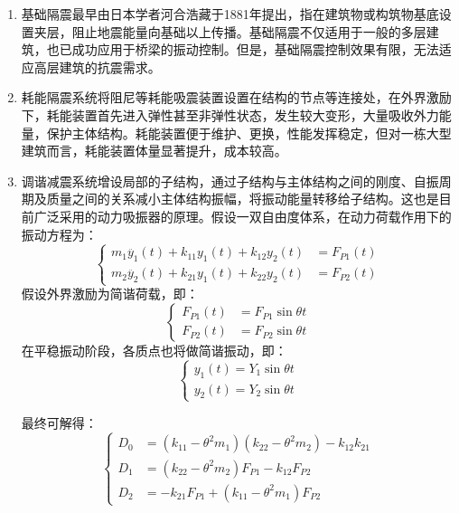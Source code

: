 \begin{enumerate}
	\item 基础隔震最早由日本学者河合浩藏于1881年提出，指在建筑物或构筑物基底设置夹层，阻止地震能量向基础以上传播。基础隔震不仅适用于一般的多层建筑，也已成功应用于桥梁的振动控制。但是，基础隔震控制效果有限，无法适应高层建筑的抗震需求\cite{Sun2012}。
	\item 耗能隔震系统将阻尼等耗能吸震装置设置在结构的节点等连接处，在外界激励下，耗能装置首先进入弹性甚至非弹性状态，发生较大变形，大量吸收外力能量，保护主体结构。耗能装置便于维护、更换，性能发挥稳定，但对一栋大型建筑而言，耗能装置体量显著提升，成本较高。
	\item 调谐减震系统增设局部的子结构，通过子结构与主体结构之间的刚度、自振周期及质量之间的关系减小主体结构振幅，将振动能量转移给子结构。这也是目前广泛采用的动力吸振器的原理。假设一双自由度体系，在动力荷载作用下的振动方程为：
	\begin{equation}
	\label{vibration}
	\left\{
	\begin{array}{rl}
	m_1\ddot{y_1}\left(t\right)+k_{11}y_1\left(t\right)+k_{12}y_2\left(t\right)&=F_{P1}\left(t\right)\\
	m_2\ddot{y_2}\left(t\right)+k_{21}y_1\left(t\right)+k_{22}y_2\left(t\right)&=F_{P2}\left(t\right)
	\end{array}
	\right.
	\end{equation}
	假设外界激励为简谐荷载，即：
	\begin{equation}
	\label{sin}
	\left\{
	\begin{array}{rl}
	F_{P1}\left(t\right)&=F_{P1}\sin \theta t\\
	F_{P2}\left(t\right)&=F_{P2}\sin \theta t
	\end{array}
	\right.
	\end{equation}
	在平稳振动阶段，各质点也将做简谐振动，即：
	\begin{equation}
	\label{sinMove}
	\left\{
	\begin{array}{rl}
	y_{1}\left(t\right)=Y_{1}\sin \theta t\\
	y_{2}\left(t\right)=Y_{2}\sin \theta t
	\end{array}
	\right.
	\end{equation}
	
	最终可解得：
	\begin{equation}
	\label{answer}
	\left\{
	\begin{array}{rl}
	D_0&=\left(k_{11}-\theta^2m_1\right)\left(k_{22}-\theta^2m_2\right)-k_{12}k_{21} \\
	D_1&=\left(k_{22}-\theta^2m_2\right)F_{P1}-k_{12}F_{P2} \\
	D_2&=-k_{21}F_{P1}+\left(k_{11}-\theta^2m_1\right)F_{P2}
	\end{array}
	\right.
	\end{equation}
	

\end{enumerate}
